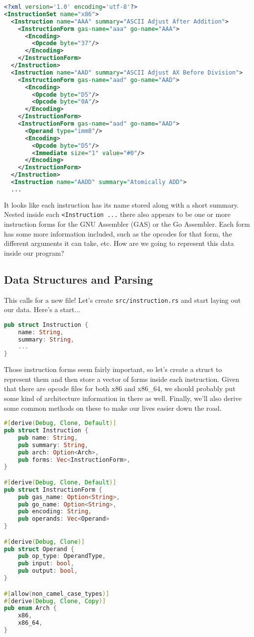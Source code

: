\begin{lstlisting}[language=xml]
<?xml version='1.0' encoding='utf-8'?>
<InstructionSet name="x86">
  <Instruction name="AAA" summary="ASCII Adjust After Addition">
    <InstructionForm gas-name="aaa" go-name="AAA">
      <Encoding>
        <Opcode byte="37"/>
      </Encoding>
    </InstructionForm>
  </Instruction>
  <Instruction name="AAD" summary="ASCII Adjust AX Before Division">
    <InstructionForm gas-name="aad" go-name="AAD">
      <Encoding>
        <Opcode byte="D5"/>
        <Opcode byte="0A"/>
      </Encoding>
    </InstructionForm>
    <InstructionForm gas-name="aad" go-name="AAD">
      <Operand type="imm8"/>
      <Encoding>
        <Opcode byte="D5"/>
        <Immediate size="1" value="#0"/>
      </Encoding>
    </InstructionForm>
  </Instruction>
  <Instruction name="AADD" summary="Atomically ADD">
  ...
\end{lstlisting}

It looks like each instruction has its name stored along with a short summary. Nested inside each \texttt{<Instruction ...} there also appears to be one or more instruction forms for the GNU Assembler (GAS) or the Go Assembler. Each form has some more information included, such as the opcodes for that form, the different arguments it can take, etc. How are we going to represent this data inside our program?

\subsection{Data Structures and Parsing}

This calls for a new file! Let's create \texttt{src/instruction.rs} and start laying out our data. Here's a start...

\begin{lstlisting}[language=rust]
pub struct Instruction {
    name: String,
    summary: String,
    ...
}
\end{lstlisting}

Those instruction forms seem fairly important, so let's create a struct to represent them and then store a vector of forms inside each instruction. Given that there are opcode files for both x86 and x86\_64, we should probably put some kind of architecture information in there as well. Finally, we'll also derive some common methods on these to make our lives easier down the road.

\begin{lstlisting}[language=rust]
#[derive(Debug, Clone, Default)]
pub struct Instruction {
    pub name: String,
    pub summary: String,
    pub arch: Option<Arch>,
    pub forms: Vec<InstructionForm>,
}

#[derive(Debug, Clone, Default)]
pub struct InstructionForm {
    pub gas_name: Option<String>,
    pub go_name: Option<String>,
    pub encoding: String,
    pub operands: Vec<Operand>
}

#[derive(Debug, Clone)]
pub struct Operand {
    pub op_type: OperandType,
    pub input: bool,
    pub output: bool,
}

#[allow(non_camel_case_types)]
#[derive(Debug, Clone, Copy)]
pub enum Arch {
    x86,
    x86_64,
}
\end{lstlisting}

